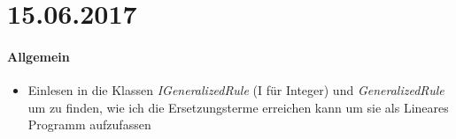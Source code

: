\section*{15.06.2017}



\paragraph{Allgemein}
\begin{itemize}
	\item Einlesen in die Klassen \emph{IGeneralizedRule} (I für Integer) und \emph{GeneralizedRule} um zu 	finden, wie ich die Ersetzungsterme erreichen kann um sie als Lineares Programm aufzufassen
		\begin{figure}[h]
			\centering
			
		\end{figure}
\end{itemize}
